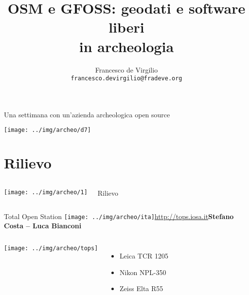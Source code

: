 \documentclass[xcolor=svgnames]{beamer}
\title[Geodati e software liberi in archeologia]{OSM e GFOSS: geodati e software liberi\\in archeologia}
\author[Francesco \mbox{de Virgilio}]{Francesco de Virgilio \\ \texttt{\tiny francesco.devirgilio@fradeve.org}}
\institute[GFOSS Day 2011]{GFOSS Day 2011}
\begin{document}
	\begin{frame}
		\begin{center}
			\huge Una settimana con un'azienda archeologica open source
		\end{center}
		\begin{center}
			\texttt{[image: ../img/archeo/d7]}
		\end{center}
	\end{frame}

	\section{Rilievo}

		\begin{frame}
			\begin{columns}[c]
				\column{.4\textwidth}
					\begin{center}
						\texttt{[image: ../img/archeo/1]}
					\end{center}
				\column{.6\textwidth}
					\Huge Rilievo
			\end{columns}
		\end{frame}


		\begin{frame}{Total Open Station\hfill
			\texttt{[image: ../img/archeo/ita]}}{\url{http://tops.iosa.it}\hfill \small{\textbf{Stefano Costa -- Luca Bianconi}}}
			\begin{columns}[c]
				\column{.5\textwidth}
					\begin{center}
						\texttt{[image: ../img/archeo/tops]}
					\end{center}
				\column{.5\textwidth}
					\begin{itemize}
						\item Leica TCR 1205
						\item Nikon NPL-350
						\item Zeiss Elta R55
					\end{itemize}
			\end{columns}
		\end{frame}

\end{document}
